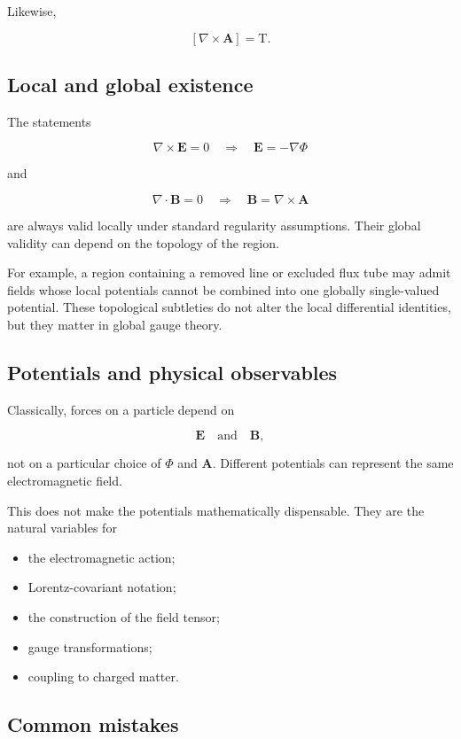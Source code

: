 Likewise,

\[
[\nabla\times\mathbf{A}]
=
\mathrm{T}.
\]

\subsection{Local and global existence}

The statements

\[
\nabla\times\mathbf{E}=0
\quad\Longrightarrow\quad
\mathbf{E}=-\nabla\Phi
\]

and

\[
\nabla\cdot\mathbf{B}=0
\quad\Longrightarrow\quad
\mathbf{B}=\nabla\times\mathbf{A}
\]

are always valid locally under standard regularity assumptions. Their global validity can depend on the topology of the region.

For example, a region containing a removed line or excluded flux tube may admit fields whose local potentials cannot be combined into one globally single-valued potential. These topological subtleties do not alter the local differential identities, but they matter in global gauge theory.

\subsection{Potentials and physical observables}

Classically, forces on a particle depend on

\[
\mathbf{E}
\quad\text{and}\quad
\mathbf{B},
\]

not on a particular choice of \(\Phi\) and \(\mathbf{A}\). Different potentials can represent the same electromagnetic field.

This does not make the potentials mathematically dispensable. They are the natural variables for

\begin{itemize}
    \item the electromagnetic action;
    \item Lorentz-covariant notation;
    \item the construction of the field tensor;
    \item gauge transformations;
    \item coupling to charged matter.
\end{itemize}

\subsection{Common mistakes}

